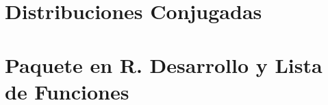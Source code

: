 \documentclass[pdftex,11pt, oneside]{book}
\begin{document}

\appendix
%

\chapter{Distribuciones Conjugadas} 
\label{ap:DistrosConjugadas}
%

\chapter{Paquete en R. Desarrollo y Lista de Funciones} \label{ap:Paquete}
%

\backmatter
{}
\printbibliography
\end{document}
